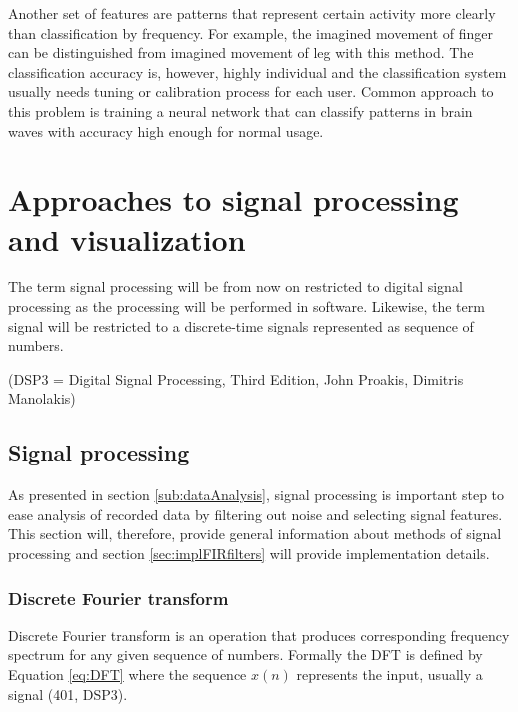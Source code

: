 Another set of features are patterns that represent certain activity more
clearly than classification by frequency. For example, the imagined movement of
finger can be distinguished from imagined movement of leg with this method. The
classification accuracy is, however, highly individual and the classification
system usually needs tuning or calibration process for each user. \cite{bcComm}
Common approach to this problem is training a neural network that can classify
patterns in brain waves with accuracy high enough for normal usage.

\chapter{Approaches to signal processing and visualization} \label{appProcVis}

The term signal processing will be from now on restricted to digital signal processing as the processing will be performed in software. Likewise, the term signal will be restricted to a discrete-time signals represented as sequence of numbers. 

(DSP3 = Digital Signal Processing, Third Edition, John Proakis, Dimitris Manolakis)
\section{Signal processing} \label{sec:sigProc}
As presented in section \ref{sub:dataAnalysis}, signal processing is important
step to ease analysis of recorded data by filtering out noise and selecting
signal features. This section will, therefore, provide general information about
methods of signal processing and section \ref{sec:implFIRfilters} will provide implementation details. 
 

\subsection{Discrete Fourier transform}
Discrete Fourier transform is an operation that produces corresponding frequency spectrum for any given sequence of numbers. Formally the DFT is defined by Equation \ref{eq:DFT} where the sequence $x(n)$ represents the input, usually a signal (401, DSP3). 

